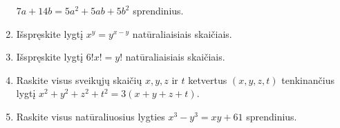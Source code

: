 \begin{enumerate}
    $7a + 14b = 5a^2 + 5ab + 5b^2$ sprendinius.
  \item \text{[LitMo 1986]} Išspręskite lygtį $x^y = y^{x-y}$
    natūraliaisiais skaičiais.
  \item \text{[LitMo 1987]} Išspręskite lygtį $6!x!=y!$ natūraliaisiais
    skaičiais.
  \item \text{[LitKo 2007]} Raskite visus sveikųjų skaičių $x, y, z$ ir $t$
    ketvertus $(x,y,z,t)$ tenkinančius lygtį $x^2 + y^2 + z^2 + t^2 = 3(x +
    y + z + t)$.
  \item Raskite visus natūraliuosius lygties $x^3 - y^3 = xy + 61$
    sprendinius.

\end{enumerate}
